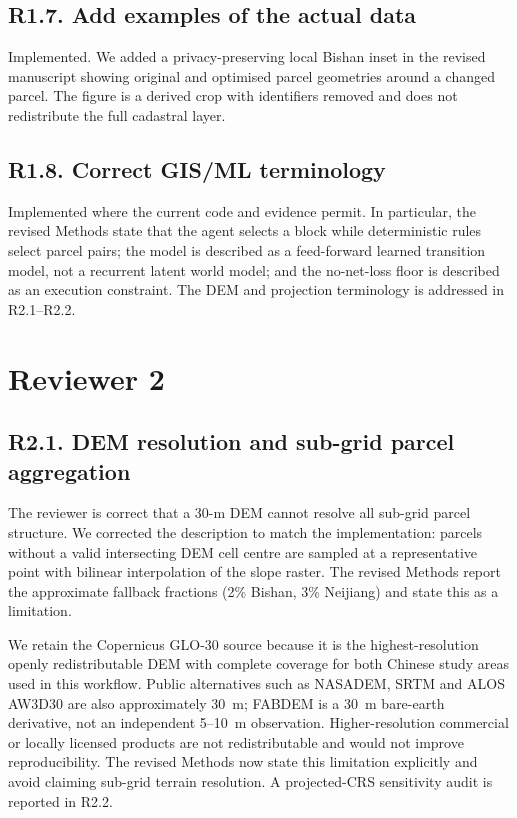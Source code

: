 ﻿\documentclass[11pt]{article}
\begin{document}
\subsection*{R1.7. Add examples of the actual data}
Implemented. We added a privacy-preserving local Bishan inset in the revised manuscript showing original and optimised parcel geometries around a changed parcel. The figure is a derived crop with identifiers removed and does not redistribute the full cadastral layer.

\subsection*{R1.8. Correct GIS/ML terminology}
Implemented where the current code and evidence permit. In particular, the revised Methods state that the agent selects a block while deterministic rules select parcel pairs; the model is described as a feed-forward learned transition model, not a recurrent latent world model; and the no-net-loss floor is described as an execution constraint. The DEM and projection terminology is addressed in R2.1--R2.2.

\section*{Reviewer 2}
\subsection*{R2.1. DEM resolution and sub-grid parcel aggregation}
The reviewer is correct that a 30-m DEM cannot resolve all sub-grid parcel structure. We corrected the description to match the implementation: parcels without a valid intersecting DEM cell centre are sampled at a representative point with bilinear interpolation of the slope raster. The revised Methods report the approximate fallback fractions (2\% Bishan, 3\% Neijiang) and state this as a limitation.

We retain the Copernicus GLO-30 source because it is the highest-resolution openly redistributable DEM with complete coverage for both Chinese study areas used in this workflow. Public alternatives such as NASADEM, SRTM and ALOS AW3D30 are also approximately 30~m; FABDEM is a 30~m bare-earth derivative, not an independent 5--10~m observation. Higher-resolution commercial or locally licensed products are not redistributable and would not improve reproducibility. The revised Methods now state this limitation explicitly and avoid claiming sub-grid terrain resolution. A projected-CRS sensitivity audit is reported in R2.2.
\end{document}
